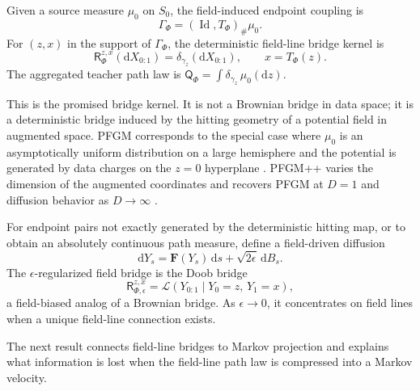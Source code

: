 \documentclass[twoside,11pt]{jmlr}
\numberwithin{equation}{section}
\newcommand{\dd}{\mathrm{d}}
\newcommand{\Law}{\mathcal{L}}
\newcommand{\scrR}{\mathsf{R}}
\newcommand{\scrQ}{\mathsf{Q}}
\newcommand{\F}{\bm F}
\newcommand{\Id}{\operatorname{Id}}
\begin{document}
\begin{definition}
Given a source measure $\mu_0$ on $S_0$, the field-induced endpoint coupling is
\begin{equation}
    \Gamma_\Phi=(\Id,T_\Phi)_\#\mu_0.
    \label{eq:field_coupling}
\end{equation}
For $(z,x)$ in the support of $\Gamma_\Phi$, the deterministic field-line bridge kernel is
\begin{equation}
    \scrR^{z,x}_{\Phi}(\dd X_{0:1})
    =\delta_{\gamma_z}(\dd X_{0:1}),
    \qquad x=T_\Phi(z).
    \label{eq:field_line_bridge_kernel}
\end{equation}
The aggregated teacher path law is $\scrQ_\Phi=\int \delta_{\gamma_z}\,\mu_0(\dd z)$.
\end{definition}

This is the promised bridge kernel. It is not a Brownian bridge in data space; it is a deterministic bridge induced by the hitting geometry of a potential field in augmented space. PFGM corresponds to the special case where $\mu_0$ is an asymptotically uniform distribution on a large hemisphere and the potential is generated by data charges on the $z=0$ hyperplane \citep{xu2022pfgm}. PFGM++ varies the dimension of the augmented coordinates and recovers PFGM at $D=1$ and diffusion behavior as $D\to\infty$ \citep{xu2023pfgmpp}.

\begin{definition}
For endpoint pairs not exactly generated by the deterministic hitting map, or to obtain an absolutely continuous path measure, define a field-driven diffusion
\begin{equation}
    \dd Y_s=\F(Y_s)\,\dd s+\sqrt{2\epsilon}\,\dd B_s.
    \label{eq:field_diffusion}
\end{equation}
The $\epsilon$-regularized field bridge is the Doob bridge
\begin{equation}
    \scrR^{z,x}_{\Phi,\epsilon}
    =\Law\left(Y_{0:1}\mid Y_0=z,\,Y_1=x\right),
    \label{eq:doob_field_bridge}
\end{equation}
a field-biased analog of a Brownian bridge. As $\epsilon\to0$, it concentrates on field lines when a unique field-line connection exists.
\end{definition}

The next result connects field-line bridges to Markov projection and explains what information is lost when the field-line path law is compressed into a Markov velocity.
\end{document}
